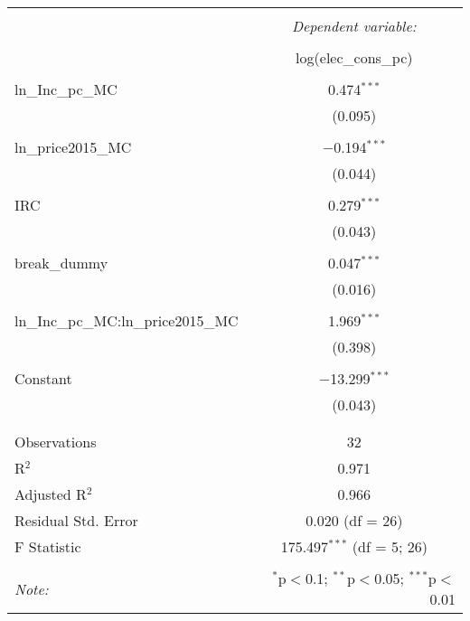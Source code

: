 
\begin{table}[!htbp] \centering 
  \caption{} 
  \label{} 
\begin{tabular}{@{\extracolsep{5pt}}lc} 
\\[-1.8ex]\hline 
\hline \\[-1.8ex] 
 & \multicolumn{1}{c}{\textit{Dependent variable:}} \\ 
\cline{2-2} 
\\[-1.8ex] & log(elec\_cons\_pc) \\ 
\hline \\[-1.8ex] 
 ln\_Inc\_pc\_MC & 0.474$^{***}$ \\ 
  & (0.095) \\ 
  & \\ 
 ln\_price2015\_MC & $-$0.194$^{***}$ \\ 
  & (0.044) \\ 
  & \\ 
 IRC & 0.279$^{***}$ \\ 
  & (0.043) \\ 
  & \\ 
 break\_dummy & 0.047$^{***}$ \\ 
  & (0.016) \\ 
  & \\ 
 ln\_Inc\_pc\_MC:ln\_price2015\_MC & 1.969$^{***}$ \\ 
  & (0.398) \\ 
  & \\ 
 Constant & $-$13.299$^{***}$ \\ 
  & (0.043) \\ 
  & \\ 
\hline \\[-1.8ex] 
Observations & 32 \\ 
R$^{2}$ & 0.971 \\ 
Adjusted R$^{2}$ & 0.966 \\ 
Residual Std. Error & 0.020 (df = 26) \\ 
F Statistic & 175.497$^{***}$ (df = 5; 26) \\ 
\hline 
\hline \\[-1.8ex] 
\textit{Note:}  & \multicolumn{1}{r}{$^{*}$p$<$0.1; $^{**}$p$<$0.05; $^{***}$p$<$0.01} \\ 
\end{tabular} 
\end{table} 
